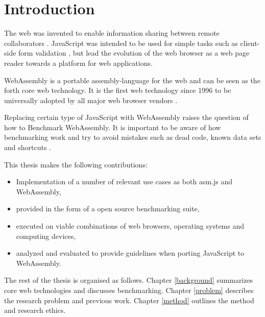 \section{Introduction}
\label{introduction}

The web was invented to enable information sharing between remote collaborators \parencite{BernersLeeCailliauLuotonenNielsenSecret1994}. JavaScript was intended to be used for simple tasks such as client-side form validation \parencite{Moller2018}, but lead the evolution of the web browser as a web page reader towards a platform for web applications.

WebAssembly is a portable assembly-language for the web \parencite{HaasRossbergSchuffTitzerHolmanGohmanWagnerZakaiBastien2017} and can be seen as the forth core web technology. It is the first web technology since 1996 to be universally adopted by all major web browser vendors \parencite{HaasRossbergSchuffTitzerHolmanGohmanWagnerZakaiBastien2017}.

Replacing certain type of JavaScript with WebAssembly raises the question of how to Benchmark WebAssembly. It is important to be aware of how benchmarking work and try to avoid mistakes such as dead code, known data sets and shortcuts \parencite{CaiNerurkarWu1998}.

This thesis makes the following contributions:

\begin{itemize}
    \item Implementation of a number of relevant use cases as both asm.js and WebAssembly,
    \item provided in the form of a open source benchmarking suite,
    \item executed on viable combinations of web browsers, operating systems and computing devices,
    \item analyzed and evaluated to provide guidelines when porting JavaScript to WebAssembly.
\end{itemize}

The rest of the thesis is organised as follows. Chapter \ref{background} summarizes core web technologies and discusses benchmarking. Chapter \ref{problem} describes the research problem and previous work. Chapter \ref{method} outlines the method and research ethics. 
